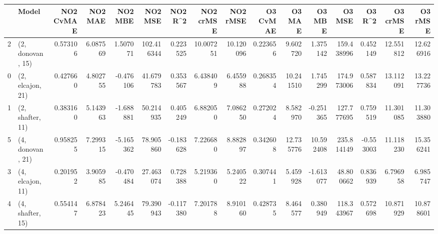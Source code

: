 \begin{tabular}{llrrrrrrrrrrrrrr}
\toprule
{} &             Model &  NO2 CvMAE &   NO2 MAE &   NO2 MBE &     NO2 MSE &   NO2 R\textasciicircum2 &  NO2 crMSE &   NO2 rMSE &  O3 CvMAE &     O3 MAE &     O3 MBE &      O3 MSE &    O3 R\textasciicircum2 &   O3 crMSE &    O3 rMSE \\
\midrule
2 &  (2, donovan, 15) &   0.573106 &  6.087569 &  1.507071 &  102.416344 &  0.223525 &  10.007251 &  10.120096 &  0.223656 &   9.602720 &   1.375142 &  159.438996 &  0.452149 &  12.551812 &  12.626916 \\
0 &  (2, elcajon, 21) &   0.427660 &  4.802755 & -0.476106 &   41.679783 &  0.353567 &   6.438409 &   6.455988 &  0.268354 &  10.241510 &   1.745299 &  174.973006 &  0.587834 &  13.112091 &  13.227736 \\
1 &  (2, shafter, 11) &   0.383160 &  5.143963 & -1.688881 &   50.214935 &  0.405249 &   6.882050 &   7.086250 &  0.272024 &   8.582970 &  -0.251365 &  127.777695 &  0.759519 &  11.301085 &  11.303880 \\
5 &  (4, donovan, 21) &   0.958255 &  7.299315 & -5.165362 &   78.905860 & -0.183628 &   7.226680 &   8.882897 &  0.342608 &  12.735776 &  10.592408 &  235.814149 & -0.553003 &  11.118230 &  15.356241 \\
3 &  (4, elcajon, 11) &   0.201952 &  3.905985 & -0.470484 &   27.463074 &  0.728388 &   5.219360 &   5.240522 &  0.307441 &   5.459928 &  -1.613077 &   48.800662 &  0.836939 &   6.796958 &   6.985747 \\
4 &  (4, shafter, 15) &   0.554147 &  6.878423 &  5.246445 &   79.390943 & -0.117380 &   7.201788 &   8.910160 &  0.428735 &   8.464577 &   0.380949 &  118.343967 &  0.572698 &  10.871929 &  10.878601 \\
\bottomrule
\end{tabular}
